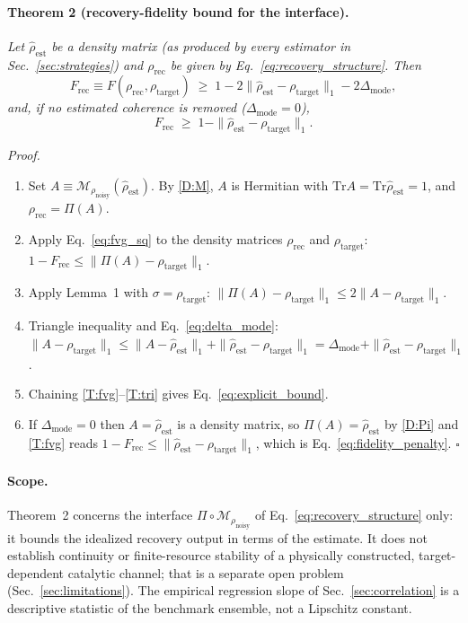 \documentclass[pra,twocolumn,superscriptaddress,longbibliography,floatfix,nofootinbib]{revtex4-2}
\newcommand{\tr}{\mathrm{Tr}}
\newcommand{\Frec}{F_\mathrm{rec}}
\newcommand{\rhot}{\rho_\mathrm{target}}
\newcommand{\rhon}{\rho_\mathrm{noisy}}
\newcommand{\rhor}{\rho_\mathrm{rec}}
\newcommand{\rhoe}{\hat{\rho}_\mathrm{est}}
\begin{document}
\paragraph{Theorem 2 (recovery-fidelity bound for the interface).}
\textit{Let $\rhoe$ be a density matrix (as produced by every estimator in Sec.~\ref{sec:strategies}) and $\rhor$ be given by Eq.~\eqref{eq:recovery_structure}. Then}
\begin{equation}
\Frec \equiv F(\rhor,\rhot) \;\geq\; 1 - 2\|\rhoe - \rhot\|_1 - 2\Delta_{\mathrm{mode}} ,
\label{eq:explicit_bound}
\end{equation}
\textit{and, if no estimated coherence is removed ($\Delta_{\mathrm{mode}} = 0$),}
\begin{equation}
\Frec \;\geq\; 1 - \|\rhoe - \rhot\|_1 .
\label{eq:fidelity_penalty}
\end{equation}

\noindent\textit{Proof.}
\begin{enumerate}[label=(T\arabic*),leftmargin=3em]
\item \label{T:A} Set $A \equiv \mathcal{M}_{\rhon}(\rhoe)$. By \ref{D:M}, $A$ is Hermitian with $\tr A = \tr\rhoe = 1$, and $\rhor = \Pi(A)$.
\item \label{T:fvg} Apply Eq.~\eqref{eq:fvg_sq} to the density matrices $\rhor$ and $\rhot$: $1 - \Frec \leq \|\Pi(A) - \rhot\|_1$.
\item \label{T:lemma} Apply Lemma~1 with $\sigma = \rhot$: $\|\Pi(A) - \rhot\|_1 \leq 2\|A - \rhot\|_1$.
\item \label{T:tri} Triangle inequality and Eq.~\eqref{eq:delta_mode}: $\|A - \rhot\|_1 \leq \|A - \rhoe\|_1 + \|\rhoe - \rhot\|_1 = \Delta_{\mathrm{mode}} + \|\rhoe - \rhot\|_1$.
\item \label{T:chain} Chaining \ref{T:fvg}--\ref{T:tri} gives Eq.~\eqref{eq:explicit_bound}.
\item \label{T:exact} If $\Delta_{\mathrm{mode}} = 0$ then $A = \rhoe$ is a density matrix, so $\Pi(A) = \rhoe$ by \ref{D:Pi} and \ref{T:fvg} reads $1 - \Frec \leq \|\rhoe - \rhot\|_1$, which is Eq.~\eqref{eq:fidelity_penalty}. \hfill$\square$
\end{enumerate}

\paragraph{Scope.}
Theorem~2 concerns the interface $\Pi\circ\mathcal{M}_{\rhon}$ of Eq.~\eqref{eq:recovery_structure} only: it bounds the idealized recovery output in terms of the estimate.
It does not establish continuity or finite-resource stability of a physically constructed, target-dependent catalytic channel; that is a separate open problem (Sec.~\ref{sec:limitations}).
The empirical regression slope of Sec.~\ref{sec:correlation} is a descriptive statistic of the benchmark ensemble, not a Lipschitz constant.
\end{document}

